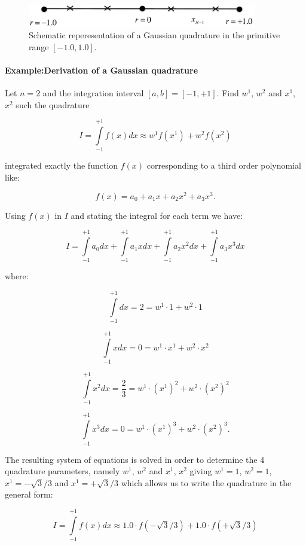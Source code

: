 \begin{figure}[H]
\centering
\includegraphics[width=10cm]{img/quagauss.pdf}
\caption{Schematic reperesentation of a Gaussian quadrature in the primitive range $[-1.0,1.0]$.}
\label{fig:quagauss}
\end{figure}

\paragraph*{Example:Derivation of a Gaussian quadrature}
Let $n=2$ and the integration interval $[a,b]=[-1,+1]$. Find $w^1$, $w^2$ and $x^1$, $x^2$ such the quadrature


\[I = \int\limits_{ - 1}^{ + 1} {f(x)dx}  \approx {w^1}f({x^1}) + {w^2}f({x^2})\]

integrated exactly the function  $f(x)$ corresponding to a third order polynomial like:



\[f(x) = {a_0} + {a_1}x + {a_2}{x^2} + {a_3}{x^3}.\]

Using $f(x)$ in $I$ and stating the integral for each term we have:


\[I = \int\limits_{ - 1}^{ + 1} {{a_0}dx}  + \int\limits_{ - 1}^{ + 1} {{a_1}xdx}  + \int\limits_{ - 1}^{ + 1} {{a_2}{x^2}dx}  + \int\limits_{ - 1}^{ + 1} {{a_3}{x^3}dx} \]

where:

\[\int\limits_{ - 1}^{ + 1} {dx}  = 2 = {w^1} \cdot 1 + {w^2} \cdot 1\]

\[\int\limits_{ - 1}^{ + 1} {xdx}  = 0 = {w^1} \cdot {x^1} + {w^2} \cdot {x^2}\]

\[\int\limits_{ - 1}^{ + 1} {{x^2}dx}  = \frac{2}{3} = {w^1} \cdot {({x^1})^2} + {w^2} \cdot {({x^2})^2}\]

\[\int\limits_{ - 1}^{ + 1} {{x^3}dx}  = 0 = {w^1} \cdot {({x^1})^3} + {w^2} \cdot {({x^2})^3}.\]

The resulting system of equations is solved in order to determine the 4 quadrature parameters, namely $w^1$, $w^2$ and $x^1$, $x^2$ giving $w^1 = 1$, $w^2 = 1$, $x^1 =  - \sqrt 3 /3$ and $x^1 =  + \sqrt 3 /3$ which allows us to write the quadrature in the general form:

\[I = \int\limits_{ - 1}^{ + 1} {f(x)dx}  \approx 1.0 \cdot f( - \sqrt 3 /3) + 1.0 \cdot f( + \sqrt 3 /3)\]

